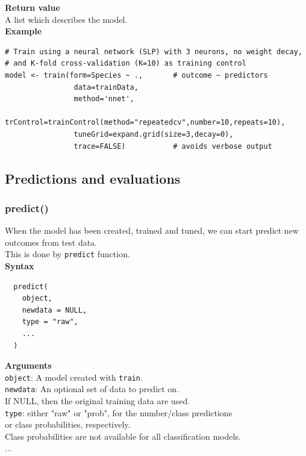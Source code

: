 \documentclass{article}
\begin{document}
\textbf{Return value}\\

A list which describes the model.\\

\textbf{Example}\\
\begin{lstlisting}
# Train using a neural network (SLP) with 3 neurons, no weight decay,
# and K-fold cross-validation (K=10) as training control
model <- train(form=Species ~ .,       # outcome ~ predictors
                data=trainData,
                method='nnet',
                trControl=trainControl(method="repeatedcv",number=10,repeats=10),
                tuneGrid=expand.grid(size=3,decay=0),
                trace=FALSE)           # avoids verbose output 
\end{lstlisting}

\pagebreak

\subsection{Predictions and evaluations}

\subsubsection{predict()}
When the model has been created, trained and tuned, we can start predict new outcomes from test data.\\
This is done by \texttt{predict} function.\\

\textbf{Syntax}
\begin{verbatim}
  predict(
    object,
    newdata = NULL,
    type = "raw",
    ...
  )
\end{verbatim}

\textbf{Arguments}\\

\texttt{object}: A model created with \texttt{train}.\\
\texttt{newdata}: An optional set of data to predict on.\\
\phantom{................}If NULL, then the original training data are used.\\
\texttt{type}: either "raw" or "prob", for the number/class predictions \\
\phantom{..........}or class probabilities, respectively.\\
\phantom{..........}Class probabilities are not available for all classification models.\\
...\\
\end{document}
